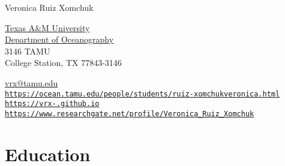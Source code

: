\documentclass[10pt,letterpaper]{article}
\def\name{Veronica Ruiz Xomchuk}
\begin{document}

{\huge \name}


\vspace{0.25in}

\begin{minipage}[ht]{0.35\textwidth}
  \href{http://www.tamu.edu/}{Texas A\&M University} \\
  \href{http://ocean.tamu.edu/}{Department of Oceanography} \\
  3146 TAMU \\
  College Station, TX 77843-3146
\end{minipage}
\begin{minipage}[ht]{0.6\textwidth}
  \href{mailto:vrx@tamu.edu}{vrx@tamu.edu} \\
  \href{https://ocean.tamu.edu/people/students/ruiz-xomchukveronica.html}{\tt https://ocean.tamu.edu/people/students/ruiz-xomchukveronica.html} \\
  \href{https://vrx-.github.io}{\tt https://vrx-.github.io} \\
  \href{https://www.researchgate.net/profile/Veronica_Ruiz_Xomchuk/}{\tt https://www.researchgate.net/profile/Veronica\_Ruiz\_Xomchuk}
  
\end{minipage}

\section*{Education}
\end{document}
